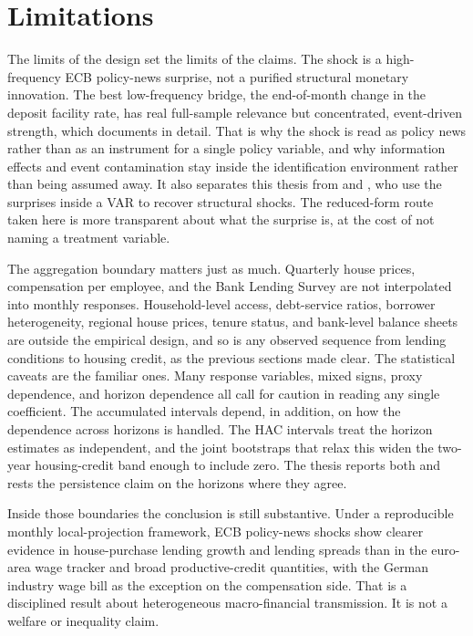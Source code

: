 \section{Limitations}

The limits of the design set the limits of the claims. The shock is a high-frequency ECB policy-news surprise, not a purified structural monetary innovation. The best low-frequency bridge, the end-of-month change in the deposit facility rate, has real full-sample relevance but concentrated, event-driven strength, which  documents in detail. That is why the shock is read as policy news rather than as an instrument for a single policy variable, and why information effects and event contamination stay inside the identification environment rather than being assumed away. It also separates this thesis from \textcite{GertlerKaradi2015} and \textcite{JarocinskiKaradi2020}, who use the surprises inside a VAR to recover structural shocks. The reduced-form route taken here is more transparent about what the surprise is, at the cost of not naming a treatment variable.

The aggregation boundary matters just as much. Quarterly house prices, compensation per employee, and the Bank Lending Survey are not interpolated into monthly responses. Household-level access, debt-service ratios, borrower heterogeneity, regional house prices, tenure status, and bank-level balance sheets are outside the empirical design, and so is any observed sequence from lending conditions to housing credit, as the previous sections made clear. The statistical caveats are the familiar ones. Many response variables, mixed signs, proxy dependence, and horizon dependence all call for caution in reading any single coefficient. The accumulated intervals depend, in addition, on how the dependence across horizons is handled. The HAC intervals treat the horizon estimates as independent, and the joint bootstraps that relax this widen the two-year housing-credit band enough to include zero. The thesis reports both and rests the persistence claim on the horizons where they agree.

Inside those boundaries the conclusion is still substantive. Under a reproducible monthly local-projection framework, ECB policy-news shocks show clearer evidence in house-purchase lending growth and lending spreads than in the euro-area wage tracker and broad productive-credit quantities, with the German industry wage bill as the exception on the compensation side. That is a disciplined result about heterogeneous macro-financial transmission. It is not a welfare or inequality claim.

